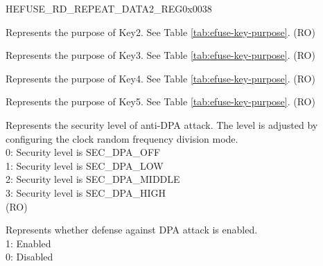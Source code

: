 \begin{register}{H}{EFUSE\_RD\_REPEAT\_DATA2\_REG}{0x0038}\label{regdesc:EFUSERDREPEATDATA2REG}
%
%
%
%
%
%
%
%
%
%
%
%
%
%
%
\regnewline%
\begin{regdesc}\begin{reglist}
\label{fielddesc:EFUSEKEYPURPOSE2}\item [EFUSE\_KEY\_PURPOSE\_2] Represents the purpose of Key2. See Table \ref{tab:efuse-key-purpose}. (RO)
\label{fielddesc:EFUSEKEYPURPOSE3}\item [EFUSE\_KEY\_PURPOSE\_3] Represents the purpose of Key3. See Table \ref{tab:efuse-key-purpose}. (RO)
\label{fielddesc:EFUSEKEYPURPOSE4}\item [EFUSE\_KEY\_PURPOSE\_4] Represents the purpose of Key4. See Table \ref{tab:efuse-key-purpose}. (RO)
\label{fielddesc:EFUSEKEYPURPOSE5}\item [EFUSE\_KEY\_PURPOSE\_5] Represents the purpose of Key5. See Table \ref{tab:efuse-key-purpose}. (RO)
\label{fielddesc:EFUSESECDPALEVEL}\item [EFUSE\_SEC\_DPA\_LEVEL] Represents the security level of anti-DPA attack. The level is adjusted by configuring the clock random frequency division mode.\\
0: Security level is SEC\_DPA\_OFF\\
1: Security level is SEC\_DPA\_LOW\\
2: Security level is SEC\_DPA\_MIDDLE\\
3: Security level is SEC\_DPA\_HIGH\\
(RO)
\label{fielddesc:EFUSECRYPTDPAENABLE}\item [EFUSE\_CRYPT\_DPA\_ENABLE] Represents whether defense against DPA attack is enabled.\\
1: Enabled\\
0: Disabled\\

\end{reglist}
\end{regdesc}
\end{register}
